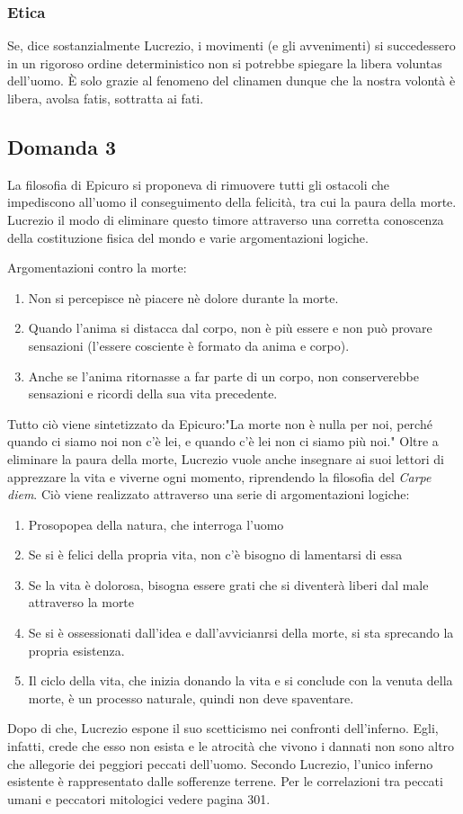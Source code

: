 \documentclass[10pt,a4paper]{article}
\begin{document}
	 \subsubsection{Etica}
	 
	 Se, dice sostanzialmente Lucrezio, i movimenti (e gli avvenimenti) si succedessero in un rigoroso ordine deterministico non si potrebbe spiegare la libera voluntas dell'uomo.
	 È solo grazie al fenomeno del clinamen dunque che la nostra volontà è libera, avolsa fatis, sottratta ai fati.
	
	\subsection{Domanda 3}
	
	La filosofia di Epicuro si proponeva di rimuovere tutti gli ostacoli che impediscono all'uomo il conseguimento della felicità, tra cui la paura della morte. Lucrezio il modo di eliminare questo timore attraverso una corretta conoscenza della costituzione fisica del mondo e varie argomentazioni logiche.
	
	Argomentazioni contro la morte:
	\begin{enumerate}
		\item Non si percepisce nè piacere nè dolore durante la morte.
		\item Quando l'anima si distacca dal corpo, non è più essere e non può provare sensazioni (l'essere cosciente è formato da anima e corpo).
		\item Anche se l'anima ritornasse a far parte di un corpo, non conserverebbe sensazioni e ricordi della sua vita precedente.
	\end{enumerate} 
	Tutto ciò viene sintetizzato da Epicuro:"La morte non è nulla per noi, perché quando ci siamo noi non c'è lei, e quando c'è lei non ci siamo più noi."
	Oltre a eliminare la paura della morte, Lucrezio vuole anche insegnare ai suoi lettori di apprezzare la vita e viverne ogni momento, riprendendo la filosofia del \textit{Carpe diem}. Ciò viene realizzato attraverso una serie di argomentazioni logiche:
	\begin{enumerate}
		\item Prosopopea della natura, che interroga l'uomo
		\item Se si è felici della propria vita, non c'è bisogno di lamentarsi di essa
		\item Se la vita è dolorosa, bisogna essere grati che si diventerà liberi dal male attraverso la morte
		\item Se si è ossessionati dall'idea e dall'avvicianrsi della morte, si sta sprecando la propria esistenza.
		\item Il ciclo della vita, che inizia donando la vita e si conclude con la venuta della morte, è un processo naturale, quindi non deve spaventare.
	\end{enumerate}
	Dopo di che, Lucrezio espone il suo scetticismo nei confronti dell'inferno. Egli, infatti, crede che esso non esista e le atrocità che vivono i dannati non sono altro che allegorie dei peggiori peccati dell'uomo. Secondo Lucrezio, l'unico inferno esistente è rappresentato dalle sofferenze terrene. Per le correlazioni tra peccati umani e peccatori mitologici vedere pagina 301.
	
\end{document}
